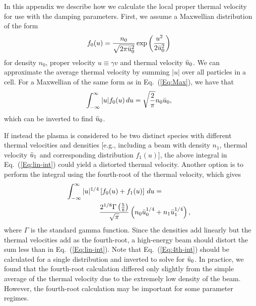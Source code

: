 \documentclass[../absorber.tex]{subfiles}
\begin{document}
In this appendix we describe how we calculate the local proper thermal velocity for use with the damping parameters.  First, we assume a Maxwellian distribution of the form
\begin{equation} \label{Eq:Max}
    f_0(u) = \frac{n_0}{\sqrt{2\pi \Bar{u}_0^2}} \exp \left( \frac{u^2}{2\Bar{u}_0^2} \right)
\end{equation}
for density $n_0$, proper velocity $u \equiv \gamma v$ and thermal velocity $\Bar{u}_0$.  We can approximate the average thermal velocity by summing $|u|$ over all particles in a cell.  For a Maxwellian of the same form as in Eq.~(\ref{Eq:Max}), we have that
\begin{equation} \label{Eq:lin-int}
    \int_{-\infty}^\infty |u| f_0(u) \, du = \sqrt{\frac{2}{\pi}}n_0\Bar{u}_0,
\end{equation}
which can be inverted to find $\Bar{u}_0$.

If instead the plasma is considered to be two distinct species with different thermal velocities and densities [e.g., including a beam with density $n_1$, thermal velocity $\Bar{u}_1$ and corresponding distribution $f_1(u)$], the above integral in Eq.~(\ref{Eq:lin-int}) could yield a distorted thermal velocity.  Another option is to perform the integral using the fourth-root of the thermal velocity, which gives
\begin{equation} \label{Eq:4th-int}
\begin{split}
    \int_{-\infty}^\infty |u|^{1/4} & \left[ f_0(u) + f_1(u) \right] \, du = \\
    & \frac{2^{1/8}\Gamma\left(\frac{5}{8}\right)}{\sqrt{\pi}} \left( n_0 \Bar{u}_0^{1/4} + n_1 \Bar{u}_1^{1/4} \right),
\end{split}
\end{equation}
where $\Gamma$ is the standard gamma function.  Since the densities add linearly but the thermal velocities add as the fourth-root, a high-energy beam should distort the sum less than in Eq.~(\ref{Eq:lin-int}).  Note that Eq.~(\ref{Eq:4th-int}) should be calculated for a single distribution and inverted to solve for $\Bar{u}_0$.  In practice, we found that the fourth-root calculation differed only slightly from the simple average of the thermal velocity due to the extremely low density of the beam.
However, the fourth-root calculation may be important for some parameter regimes.
\end{document}
